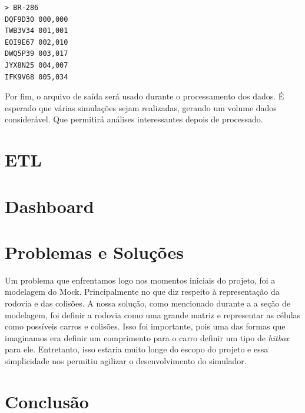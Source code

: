 \documentclass{article}
\begin{document}
    \begin{verbatim}
> BR-286
DQF9D30 000,000
TWB3V34 001,001
EOI9E67 002,010
DWQ5P39 003,017
JYX8N25 004,007
IFK9V68 005,034
    \end{verbatim}

    Por fim, o arquivo de saída será usado durante o processamento dos dados. É esperado que várias
    simulações sejam realizadas, gerando um volume dados considerável. Que permitirá análises interessantes
    depois de processado.

    \section{ETL}

    \section{Dashboard}

    \section{Problemas e Soluções}
    Um problema que enfrentamos logo nos momentos iniciais do projeto, foi a modelagem do Mock. Principalmente
    no que diz respeito à representação da rodovia e das colisões. A nossa solução, como mencionado durante a 
    a seção de modelagem, foi definir a rodovia como uma grande matriz e representar as células como possíveis
    carros e colisões. Isso foi importante, pois uma das formas que imaginamos era definir um comprimento para o 
    carro definir um tipo de \textit{hitbox} para ele. Entretanto, isso estaria muito longe do escopo do projeto
    e essa simplicidade nos permitiu agilizar o desenvolvimento do simulador.

    \section{Conclusão}
\end{document}

